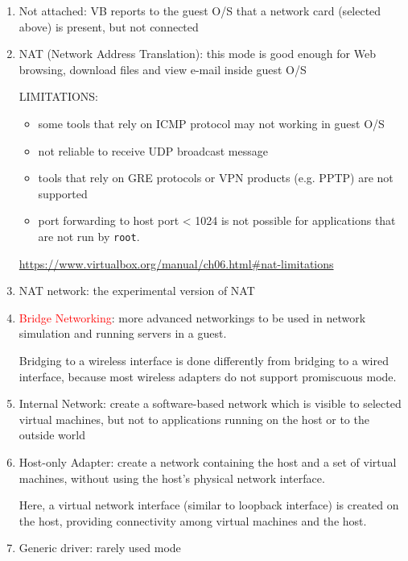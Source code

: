 \begin{enumerate}
  \item Not attached: VB reports to the guest O/S that a network card
  (selected above) is present, but not connected
  
  
  \item NAT (Network Address Translation): this mode is good enough for Web
  browsing, download files and view e-mail inside guest O/S
  
  LIMITATIONS:
  \begin{itemize}
    \item some tools that rely on ICMP protocol may not working in guest O/S
    \item not reliable to receive UDP broadcast message
    \item tools that rely on GRE protocols or VPN products (e.g. PPTP) are not
    supported
    \item port forwarding to host port < 1024 is not possible for applications
    that are not run by \verb!root!.
  \end{itemize}
  \url{https://www.virtualbox.org/manual/ch06.html#nat-limitations}
  
  \item NAT network:  the experimental version of NAT
  
  \item \textcolor{red}{Bridge Networking}: more advanced networkings to be used
  in network simulation and running servers in a guest.
  
  Bridging to a wireless interface is done differently from bridging to a wired
  interface, because most wireless adapters do not support promiscuous mode.
  
  \item Internal Network: create a software-based network which is visible to
  selected virtual machines, but not to applications running on the host or to
  the outside world
  
  \item Host-only Adapter: create a network containing the host and a set of 
  virtual machines, without using the host's physical network interface.
  
  Here, a virtual network interface (similar to loopback interface) is created
  on the host, providing connectivity among virtual machines and the host.
  
  \item Generic driver: rarely used mode
\end{enumerate}

